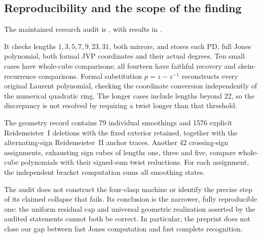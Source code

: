 \subsection{Reproducibility and the scope of the finding}

The maintained research audit is
, with results in
.

It checks lengths $1,3,5,7,9,23,31$, both mirrors, and stores each PD,
full Jones polynomial, both formal JVP coordinates and their actual degrees.
Ten small cases have whole-cube comparisons; all fourteen have faithful
recovery and skein-recurrence comparisons.  Formal substitution
$p=z-z^{-1}$ reconstructs every original Laurent polynomial, checking the
coordinate conversion independently of the numerical quadratic ring.
The longer cases include lengths beyond 22, so the discrepancy is not
resolved by requiring a twist longer than that threshold.

The geometry record contains 79 individual smoothings and 1576 explicit
Reidemeister~I deletions with the fixed exterior retained, together with
the alternating-sign Reidemeister~II anchor traces.  Another 42 crossing-sign
assignments, exhausting sign cubes of lengths one, three and five, compare
whole-cube polynomials with their signed-sum twist reductions.  For each
assignment, the independent bracket computation sums all smoothing states.

The audit does not construct the four-clasp machine or identify the precise
step of its claimed collapse that fails.  Its conclusion is the narrower,
fully reproducible one: the uniform residual cap and universal geometric
realization asserted by the audited statements cannot both be correct.
In particular, the preprint does not close our gap between fast Jones
computation and fast complete recognition.
